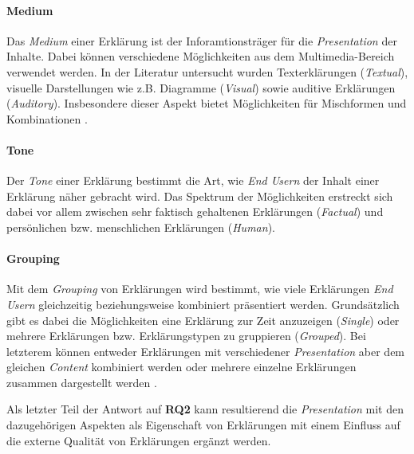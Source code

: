 \paragraph{Medium} Das \textit{Medium} einer Erklärung ist der Inforamtionsträger für die \textit{Presentation} der Inhalte. Dabei können verschiedene Möglichkeiten aus dem Multimedia-Bereich verwendet werden. In der Literatur untersucht wurden Texterklärungen (\textit{Textual}), visuelle Darstellungen wie z.B. Diagramme (\textit{Visual}) sowie auditive Erklärungen (\textit{Auditory}). Insbesondere dieser Aspekt bietet Möglichkeiten für Mischformen und Kombinationen \cite{kouki_user_2017}.

\paragraph{Tone} Der \textit{Tone} einer Erklärung bestimmt die Art, wie \textit{End Usern} der Inhalt einer Erklärung näher gebracht wird. Das Spektrum der Möglichkeiten erstreckt sich dabei vor allem zwischen sehr faktisch gehaltenen Erklärungen (\textit{Factual}) und persönlichen bzw. menschlichen Erklärungen (\textit{Human}).

\paragraph{Grouping} Mit dem \textit{Grouping} von Erklärungen wird bestimmt, wie viele Erklärungen \textit{End Usern} gleichzeitig beziehungsweise kombiniert präsentiert werden. Grundsätzlich gibt es dabei die Möglichkeiten eine Erklärung zur Zeit anzuzeigen (\textit{Single}) oder mehrere Erklärungen bzw. Erklärungstypen zu gruppieren (\textit{Grouped}). Bei letzterem können entweder Erklärungen mit verschiedener \textit{Presentation} aber dem gleichen \textit{Content} kombiniert werden \cite{kouki_user_2017} oder mehrere einzelne Erklärungen zusammen dargestellt werden \cite{balog_measuring_2020}.

\bigskip

Als letzter Teil der Antwort auf \textbf{RQ2} kann resultierend die \textit{Presentation} mit den dazugehörigen Aspekten als Eigenschaft von Erklärungen mit einem Einfluss auf die externe Qualität von Erklärungen ergänzt werden.

\smallskip

\noindent{}

